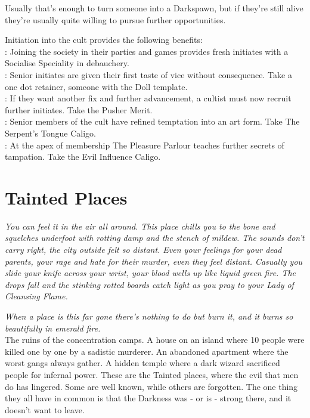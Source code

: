 Usually that's enough to turn someone into a Darkspawn, but if they're still alive they're usually quite willing to pursue further opportunities. 

Initiation into the cult provides the following benefits: \\

\noindent \textbullet: Joining the society in their parties and games provides fresh initiates with a Socialise Speciality in debauchery.\\
\noindent \textbullet\textbullet: Senior initiates are given their first taste of vice without consequence. Take a one dot retainer, someone with the Doll template.\\
\noindent \textbullet\textbullet\textbullet: If they want another fix and further advancement, a cultist must now recruit further initiates. Take the Pusher Merit. \\
\noindent \textbullet\textbullet\textbullet\textbullet: Senior members of the cult have refined temptation into an art form. Take The Serpent's Tongue Caligo. \\
\noindent \textbullet\textbullet\textbullet\textbullet\textbullet: At the apex of membership The Pleasure Parlour teaches further secrets of tampation. Take the Evil Influence Caligo. 

\section*{Tainted Places}
\textit{You can feel it in the air all around. This place chills you to the bone and squelches underfoot with rotting damp and the stench of mildew. The sounds don't carry right, the city outside felt so distant. Even your feelings for your dead parents, your rage and hate for their murder, even they feel distant. Casually you slide your knife across your wrist, your blood wells up like liquid green fire. The drops fall and the stinking rotted boards catch light as you pray to your Lady of Cleansing Flame.}

\textit{When a place is this far gone there's nothing to do but burn it, and it burns so beautifully in emerald fire.} \\

\noindent The ruins of the concentration camps. A house on an island where 10 people were killed one by one by a sadistic murderer. An abandoned apartment where the worst gangs always gather. A hidden temple where a dark wizard sacrificed people for infernal power. These are the Tainted places, where the evil that men do has lingered. Some are well known, while others are forgotten. The one thing they all have in common is that the Darkness was - or is - strong there, and it doesn't want to leave.

